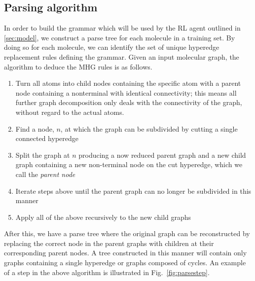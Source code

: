\documentclass{article}
\begin{document}
\subsection{Parsing algorithm}\label{sec:parsing}
In order to build the grammar which will be used by the RL agent outlined in \ref{sec:model}, we  construct a parse tree for each molecule in a training set. By doing so for each molecule, we can identify the set of unique hyperedge replacement rules defining the grammar. Given an input molecular graph, the algorithm to deduce the MHG rules is as follows.
\begin{enumerate}
	\item Turn all atoms into child nodes containing the specific atom with a parent node containing a nonterminal with identical connectivity; this means all further graph decomposition only deals with the connectivity of the graph, without regard to the actual atoms.
	\item Find a node, $n$, at which the graph can be subdivided by cutting a single connected hyperedge
    \item Split the graph at $n$ producing a now reduced parent graph and a new child graph containing a new non-terminal node on the cut hyperedge, which we call the {\em parent node}
    \item Iterate steps above until the parent graph can no longer be subdivided in this manner
    \item Apply all of the above recursively to the new child graphs
\end{enumerate}
After this, we have a parse tree where the original graph can be reconstructed by replacing the correct node in the parent graphs with children at their corresponding parent nodes. A tree constructed in this manner will contain only graphs containing a single hyperedge or graphs composed of cycles. An example of a step in the above algorithm is illustrated in Fig.~\ref{fig:parsestep}.
\end{document}
